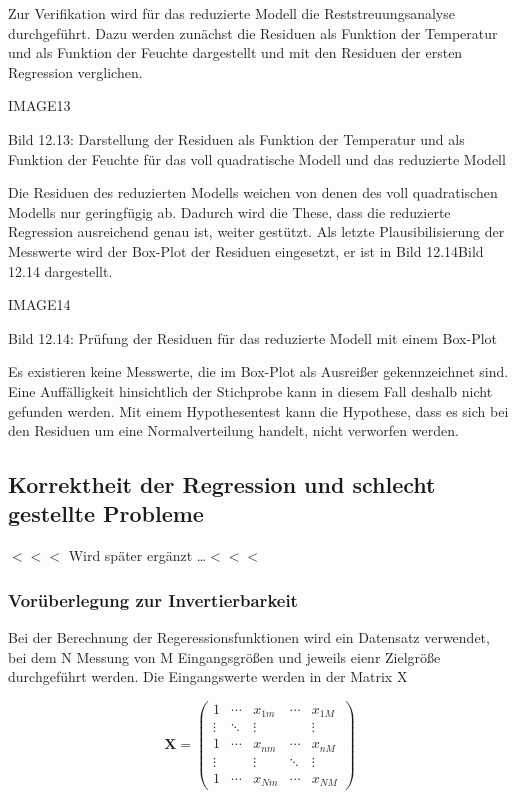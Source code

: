 \noindent Zur Verifikation wird f\"{u}r das reduzierte Modell die Reststreuungsanalyse durchgef\"{u}hrt. Dazu werden zun\"{a}chst die Residuen als Funktion der Temperatur und als Funktion der Feuchte dargestellt und mit den Residuen der ersten Regression verglichen.

IMAGE13

\noindent Bild 12.13: Darstellung der Residuen als Funktion der Temperatur und als Funktion der Feuchte f\"{u}r das voll quadratische Modell und das reduzierte Modell

\noindent Die Residuen des reduzierten Modells weichen von denen des voll quadratischen Modells nur geringf\"{u}gig ab. Dadurch wird die These, dass die reduzierte Regression ausreichend genau ist, weiter gest\"{u}tzt. Als letzte Plausibilisierung der Messwerte wird der Box-Plot der Residuen eingesetzt, er ist in Bild 12.14Bild 12.14 dargestellt.

IMAGE14

\noindent Bild 12.14: Pr\"{u}fung der Residuen f\"{u}r das reduzierte Modell mit einem Box-Plot

\noindent Es existieren keine Messwerte, die im Box-Plot als Ausrei{\ss}er gekennzeichnet sind. Eine Auff\"{a}lligkeit hinsichtlich der Stichprobe kann in diesem Fall deshalb nicht gefunden werden. Mit einem Hypothesentest kann die Hypothese, dass es sich bei den Residuen um eine Normalverteilung handelt, nicht verworfen werden. 

\clearpage

\subsection{Korrektheit der Regression und schlecht gestellte Probleme}

\noindent $<<<$ Wird sp\"{a}ter erg\"{a}nzt {\dots}$<<<$

\subsubsection{Vor\"{u}berlegung zur Invertierbarkeit}

\noindent Bei der Berechnung der Regeressionsfunktionen wird ein Datensatz verwendet, bei dem N Messung von M Eingangsgr\"{o}{\ss}en und jeweils eienr Zielgr\"{o}{\ss}e durchgef\"{u}hrt werden. Die Eingangswerte werden in der Matrix X

\begin{equation}\label{eq:thirteeneightyfour}
\mathbf{X}=\left(\begin{array}{ccccc} {1} & {\cdots } & {x_{1m} } & {\cdots } & {x_{1M} } \\ {\vdots } & {\ddots } & {\vdots } & {} & {\vdots } \\ {1} & {\cdots } & {x_{nm} } & {\cdots } & {x_{nM} } \\ {\vdots } & {} & {\vdots } & {\ddots } & {\vdots } \\ {1} & {\cdots } & {x_{Nm} } & {\cdots } & {x_{NM} } \end{array}\right)
\end{equation}

